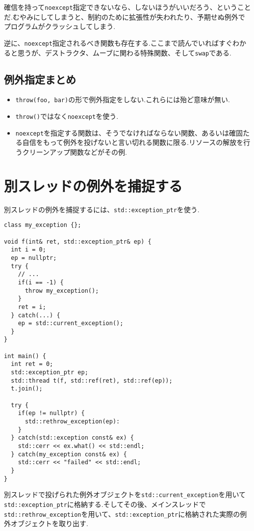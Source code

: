 \documentclass[a4j,11pt,openright]{jsbook}
\begin{document}
確信を持って\verb|noexcept|指定できないなら、しないほうがいいだろう、ということだ.むやみにしてしまうと、制約のために拡張性が失われたり、予期せぬ例外でプログラムがクラッシュしてしまう.

逆に、\verb|noexcept|指定されるべき関数も存在する.ここまで読んでいればすぐわかると思うが、デストラクタ、ムーブに関わる特殊関数、そして\verb|swap|である.

\subsection{例外指定まとめ}

\begin{itemize}
  \item \verb|throw(foo, bar)|の形で例外指定をしない.これらには殆ど意味が無い.
  \item \verb|throw()|ではなく\verb|noexcept|を使う.
  \item \verb|noexcept|を指定する関数は、そうでなければならない関数、あるいは確固たる自信をもって例外を投げないと言い切れる関数に限る.リソースの解放を行うクリーンアップ関数などがその例.
\end{itemize}


\section{別スレッドの例外を捕捉する}

別スレッドの例外を捕捉するには、\verb|std::exception_ptr|を使う.

\begin{verbatim}
class my_exception {};

void f(int& ret, std::exception_ptr& ep) {
  int i = 0;
  ep = nullptr;
  try {
    // ...
    if(i == -1) {
      throw my_exception();
    }
    ret = i;
  } catch(...) {
    ep = std::current_exception();
  }
}

int main() {
  int ret = 0;
  std::exception_ptr ep;
  std::thread t(f, std::ref(ret), std::ref(ep));
  t.join();

  try {
    if(ep != nullptr) {
      std::rethrow_exception(ep):
    }
  } catch(std::exception const& ex) {
    std::cerr << ex.what() << std::endl;
  } catch(my_exception const& ex) {
    std::cerr << "failed" << std::endl;
  }
}
\end{verbatim}

別スレッドで投げられた例外オブジェクトを\verb|std::current_exception|を用いて\verb|std::exception_ptr|に格納する.そしてその後、メインスレッドで\verb|std::rethrow_exception|を用いて、\verb|std::exception_ptr|に格納された実際の例外オブジェクトを取り出す.
\end{document}
